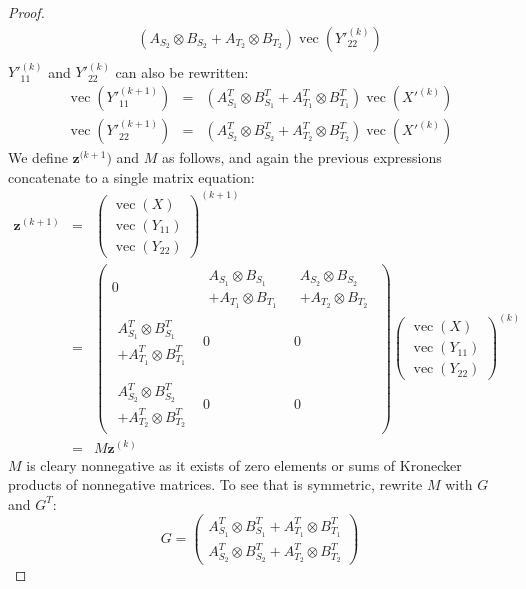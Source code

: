\documentclass[a4paper,11pt]{report}
\newcommand{\vect}{\operatorname{vec}}
\begin{document}
\begin{proof}
\begin{eqnarray*}
  (A_{S_2} \otimes  B_{S_2} + A_{T_2} \otimes B_{T_2})\vect(Y'^{(k)}_{22})\\
\end{eqnarray*}
$Y'^{(k)}_{11}$ and $Y'^{(k)}_{22}$ can also be rewritten:
\begin{eqnarray*}
  \vect(Y'^{(k+1)}_{11}) &=& (A^T_{S_1} \otimes  B^T_{S_1} + A^T_{T_1} \otimes B^T_{T_1})\vect(X'^{(k)})\\
  \vect(Y'^{(k+1)}_{22}) &=& (A^T_{S_2} \otimes  B^T_{S_2} + A^T_{T_2} \otimes B^T_{T_2})\vect(X'^{(k)})
\end{eqnarray*}
We define $\mathbf{z}^{(k+1})$ and $M$ as follows, and again the previous 
expressions concatenate to a single matrix equation:
\begin{eqnarray*}
  \mathbf{z}^{(k+1)} &=& \begin{pmatrix}
  \vect(X)\\
  \vect(Y_{11})\\
  \vect(Y_{22})
  \end{pmatrix}^{(k+1)}\\
  &=& \left(\begin{array}{lll}  
  0 &  \begin{array}{l}
A_{S_1} \otimes  B_{S_1}\\ + A_{T_1} \otimes B_{T_1}\end{array}   & \begin{array}{l}
 A_{S_2} \otimes  B_{S_2}\\ + A_{T_2} \otimes 
  B_{T_2}\end{array} \\
\begin{array}{l}
 A^T_{S_1} \otimes  B^T_{S_1}\\ + A^T_{T_1} \otimes B^T_{T_1}\end{array}   & 0  & 
 0\\\\
 \begin{array}{l} A^T_{S_2} \otimes  B^T_{S_2}\\ + A^T_{T_2} \otimes B^T_{T_2}\end{array} & 0 & 0
  \end{array}\right)\begin{pmatrix}
  \vect(X)\\
  \vect(Y_{11})\\
  \vect(Y_{22})
  \end{pmatrix}^{(k)}\\
  &=& M\mathbf{z}^{(k)}
\end{eqnarray*}
$M$ is cleary nonnegative as it exists of zero elements or sums of Kronecker 
products of nonnegative matrices. To see that is symmetric, rewrite $M$ with $G$ 
and $G^T$:
$$G = \begin{pmatrix}
A^T_{S_1} \otimes  B^T_{S_1} + A^T_{T_1} \otimes B^T_{T_1}\\
A^T_{S_2} \otimes  B^T_{S_2} + A^T_{T_2} \otimes B^T_{T_2}
\end{pmatrix}$$


\end{proof}
\end{document}
